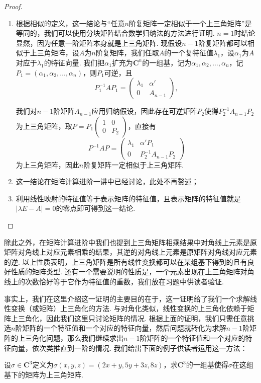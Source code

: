 \begin{proof}
    \begin{enumerate}
        \item 根据相似的定义，这一结论与``任意$n$阶复矩阵一定相似于一个上三角矩阵''是等同的，我们可以使用分块矩阵结合数学归纳法的方法进行证明. $n=1$时结论显然，因为任意一阶矩阵本身就是上三角矩阵. 现假设$n-1$阶复矩阵都可以相似于上三角矩阵，设$A$为$n$阶复矩阵，我们任取$A$的一个复特征值$\lambda_1$，设$\alpha_1$为$A$对应于$\lambda_1$的特征向量. 我们把$\alpha_1$扩充为$\mathbf{C}^n$的一组基，记为$\alpha_1,\alpha_2,\ldots,\alpha_n$，记$P_1=(\alpha_1,\alpha_2,\ldots,\alpha_n)$，则$P_1$可逆，且
              \[P_1^{-1}AP_1=\begin{pmatrix}
                      \lambda_1 & \alpha' \\ 0 & A_{n-1}
                  \end{pmatrix},\]

              我们对$n-1$阶矩阵$A_{n-1}$应用归纳假设，因此存在可逆矩阵$P_2$使得$P_2^{-1}A_{n-1}P_2$为上三角矩阵，取$P=P_1\begin{pmatrix}
                      1 & 0 \\ 0 & P_2
                  \end{pmatrix}$，直接有
              \[P^{-1}AP=\begin{pmatrix}
                      \lambda_1 & \alpha'P_1 \\ 0 & P_2^{-1}A_{n-1}P_2
                  \end{pmatrix}\]
              为上三角矩阵，因此$n$阶复矩阵一定相似于上三角矩阵.

        \item 这一结论在矩阵计算进阶一讲中已经讨论，此处不再赘述；

        \item 利用线性映射的特征值等于表示矩阵的特征值，且表示矩阵的特征值就是$|\lambda E-A|=0$的零点即可得到这一结论.
    \end{enumerate}
\end{proof}

除此之外，在矩阵计算进阶中我们也提到上三角矩阵相乘结果中对角线上元素是原矩阵对角线上对应元素相乘的结果，其逆的对角线上元素是原矩阵对角线对应元素的逆. 以上性质表明，上三角矩阵是所有线性变换都可以在某组基下得到的且有良好性质的矩阵类型. 还有一个需要说明的性质是，一个元素出现在上三角矩阵对角线上的次数恰好等于它作为特征值的重数，我们放在习题中供读者验证.

事实上，我们在这里介绍这一证明的主要目的在于，这一证明给了我们一个求解线性变换（或矩阵）上三角化的方法. 与对角化类似，线性变换的上三角化依赖于矩阵上三角化，因此我们这里只讨论矩阵的情况. 根据上面的证明，我们只需任意挑选$n$阶矩阵的一个特征值和一个对应的特征向量，然后问题就转化为求解$n-1$阶矩阵的上三角化问题，那么我们继续求出$n-1$阶矩阵的一个特征值和一个对应的特征向量，依次类推直到一阶的情况. 我们给出下面的例子供读者运用这一方法：
\begin{example}
    设$\sigma\in\mathbf{C}^3$定义为$\sigma(x,y,z)=(2x+y,5y+3z,8z)$，求$\mathbf{C}^3$的一组基使得$\sigma$在这组基下的矩阵为上三角矩阵.
\end{example}

